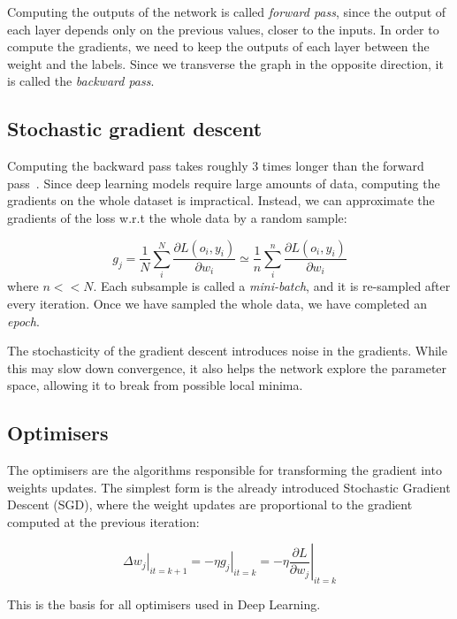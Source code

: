 Computing the outputs 
of the network is called \emph{forward pass}, since the output of each layer depends only on the previous values, closer to the inputs.
In order to compute the gradients, we need to keep the outputs of each layer between the weight and the labels.
Since we transverse the graph in the opposite direction, it is called the \emph{backward pass}.

\subsection{Stochastic gradient descent}\label{sec:sgd}
Computing the backward pass takes roughly 3 times longer than the forward pass~\citep{dl_course}.
Since deep learning models require large amounts of data, computing the gradients on the whole dataset is impractical.
Instead, we can approximate the gradients of the loss w.r.t the whole data by a random sample:

\begin{equation*}
g_j = \frac{1}{N} \sum_i^N \frac{\partial L\left(o_i, y_i\right)}{\partial w_i} \simeq \frac{1}{n} \sum_i^n \frac{\partial L\left(o_i, y_i\right)}{\partial w_i}
\end{equation*}
where $n << N$.
Each subsample is called a \emph{mini-batch}, 
and it is re-sampled after every iteration.
Once we have sampled the whole data, we have completed an \emph{epoch}.

The stochasticity of the gradient descent introduces noise in the gradients.
While this may slow down convergence, it also helps the network explore the parameter space, allowing it to break from possible local minima.

\subsection{Optimisers}
The optimisers are the algorithms responsible for transforming the gradient into weights updates.
The simplest form is the already introduced Stochastic Gradient Descent (SGD), 
where the weight updates are proportional to the gradient computed at the previous iteration:

\begin{equation*}
\left.\Delta w_j\right|_{it=k+1} = - \left.\eta g_j\right|_{it=k} = - \eta \left.\frac{\partial L}{\partial w_j}\right|_{it=k}
\end{equation*}

This is the basis for all optimisers used in Deep Learning.


